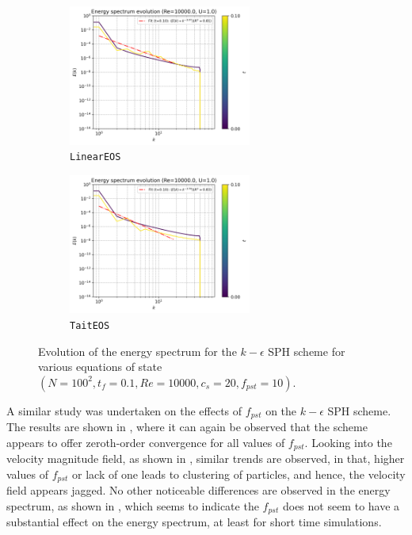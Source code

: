\begin{figure}[htbp!]
  \begin{subfigure}{7cm}
    \centering\includegraphics[width=6cm]{Code-Figures/keps/eos/c0_20_linear_pec_dtmul_1_nx_100_pst_10_re_10000_k_eps/energy_spectrum_evolution.png}
    \caption{\texttt{LinearEOS}}
  \end{subfigure}
  \begin{subfigure}{7cm}
    \centering\includegraphics[width=6cm]{Code-Figures/keps/eos/c0_20_tait_pec_dtmul_1_nx_100_pst_10_re_10000_k_eps/energy_spectrum_evolution.png}
    \caption{\texttt{TaitEOS}}
  \end{subfigure}
  \caption{Evolution of the energy spectrum for the $k-\epsilon$ SPH scheme for various equations of state $(N=100^2, t_f=0.1, Re=10000, c_s=20, f_{pst}=10)$.}
  \label{fig:keps-eos-espec}
\end{figure}

A similar study was undertaken on the effects of $f_{pst}$ on the $k-\epsilon$ SPH scheme. The results are shown in , where it can again be observed that the scheme appears to offer zeroth-order convergence for all values of $f_{pst}$.
Looking into the velocity magnitude field, as shown in , similar trends are observed, in that, higher values of $f_{pst}$ or lack of one leads to clustering of particles, and hence, the velocity field appears jagged.
No other noticeable differences are observed in the energy spectrum, as shown in , which seems to indicate the $f_{pst}$ does not seem to have a substantial effect on the energy spectrum, at least for short time simulations.

